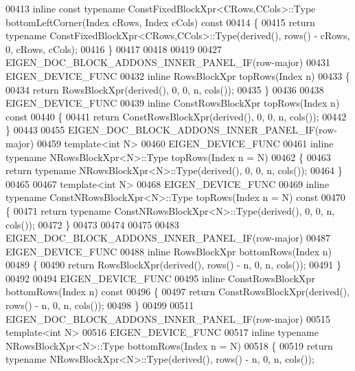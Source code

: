 \begin{DoxyCode}
00413 \textcolor{keyword}{inline} \textcolor{keyword}{const} \textcolor{keyword}{typename} ConstFixedBlockXpr<CRows,CCols>::Type bottomLeftCorner(Index cRows, Index cCols)\textcolor{keyword}{
       const}
00414 \textcolor{keyword}{}\{
00415   \textcolor{keywordflow}{return} \textcolor{keyword}{typename} ConstFixedBlockXpr<CRows,CCols>::Type(derived(), rows() - cRows, 0, cRows, cCols);
00416 \}
00417 
00418 
00419 
00427 EIGEN\_DOC\_BLOCK\_ADDONS\_INNER\_PANEL\_IF(row-major)
00431 EIGEN\_DEVICE\_FUNC
00432 \textcolor{keyword}{inline} RowsBlockXpr topRows(Index n)
00433 \{
00434   \textcolor{keywordflow}{return} RowsBlockXpr(derived(), 0, 0, n, cols());
00435 \}
00436 
00438 EIGEN\_DEVICE\_FUNC
00439 \textcolor{keyword}{inline} ConstRowsBlockXpr topRows(Index n)\textcolor{keyword}{ const}
00440 \textcolor{keyword}{}\{
00441   \textcolor{keywordflow}{return} ConstRowsBlockXpr(derived(), 0, 0, n, cols());
00442 \}
00443 
00455 EIGEN\_DOC\_BLOCK\_ADDONS\_INNER\_PANEL\_IF(row-major)
00459 \textcolor{keyword}{template}<\textcolor{keywordtype}{int} N>
00460 EIGEN\_DEVICE\_FUNC
00461 \textcolor{keyword}{inline} \textcolor{keyword}{typename} NRowsBlockXpr<N>::Type topRows(Index n = N)
00462 \{
00463   \textcolor{keywordflow}{return} \textcolor{keyword}{typename} NRowsBlockXpr<N>::Type(derived(), 0, 0, n, cols());
00464 \}
00465 
00467 \textcolor{keyword}{template}<\textcolor{keywordtype}{int} N>
00468 EIGEN\_DEVICE\_FUNC
00469 \textcolor{keyword}{inline} \textcolor{keyword}{typename} ConstNRowsBlockXpr<N>::Type topRows(Index n = N)\textcolor{keyword}{ const}
00470 \textcolor{keyword}{}\{
00471   \textcolor{keywordflow}{return} \textcolor{keyword}{typename} ConstNRowsBlockXpr<N>::Type(derived(), 0, 0, n, cols());
00472 \}
00473 
00474 
00475 
00483 EIGEN\_DOC\_BLOCK\_ADDONS\_INNER\_PANEL\_IF(row-major)
00487 EIGEN\_DEVICE\_FUNC
00488 \textcolor{keyword}{inline} RowsBlockXpr bottomRows(Index n)
00489 \{
00490   \textcolor{keywordflow}{return} RowsBlockXpr(derived(), rows() - n, 0, n, cols());
00491 \}
00492 
00494 EIGEN\_DEVICE\_FUNC
00495 \textcolor{keyword}{inline} ConstRowsBlockXpr bottomRows(Index n)\textcolor{keyword}{ const}
00496 \textcolor{keyword}{}\{
00497   \textcolor{keywordflow}{return} ConstRowsBlockXpr(derived(), rows() - n, 0, n, cols());
00498 \}
00499 
00511 EIGEN\_DOC\_BLOCK\_ADDONS\_INNER\_PANEL\_IF(row-major)
00515 \textcolor{keyword}{template}<\textcolor{keywordtype}{int} N>
00516 EIGEN\_DEVICE\_FUNC
00517 \textcolor{keyword}{inline} \textcolor{keyword}{typename} NRowsBlockXpr<N>::Type bottomRows(Index n = N)
00518 \{
00519   \textcolor{keywordflow}{return} \textcolor{keyword}{typename} NRowsBlockXpr<N>::Type(derived(), rows() - n, 0, n, cols());

\end{DoxyCode}
